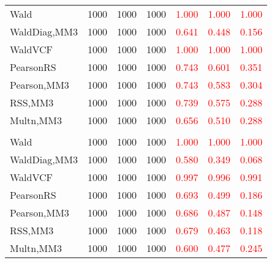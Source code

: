 \documentclass[
]{article}
\begin{document}
\begin{table}[H]
{\begin{tabular}[t]{lrrrrrr}
\hspace{1em}Wald & 1000 & 1000 & 1000 & \textcolor{red}{1.000} & \textcolor{red}{1.000} & \vphantom{1} \textcolor{red}{1.000}\\
\hspace{1em}WaldDiag,MM3 & 1000 & 1000 & 1000 & \textcolor{red}{0.641} & \textcolor{red}{0.448} & \textcolor{red}{0.156}\\
\hspace{1em}WaldVCF & 1000 & 1000 & 1000 & \textcolor{red}{1.000} & \textcolor{red}{1.000} & \textcolor{red}{1.000}\\
\hspace{1em}PearsonRS & 1000 & 1000 & 1000 & \textcolor{red}{0.743} & \textcolor{red}{0.601} & \textcolor{red}{0.351}\\
\hspace{1em}Pearson,MM3 & 1000 & 1000 & 1000 & \textcolor{red}{0.743} & \textcolor{red}{0.583} & \textcolor{red}{0.304}\\
\hspace{1em}RSS,MM3 & 1000 & 1000 & 1000 & \textcolor{red}{0.739} & \textcolor{red}{0.575} & \textcolor{red}{0.288}\\
\hspace{1em}Multn,MM3 & 1000 & 1000 & 1000 & \textcolor{red}{0.656} & \textcolor{red}{0.510} & \textcolor{red}{0.288}\\
\addlinespace[0.3em]
\multicolumn{7}{l}{\textbf{3F 15V}}\\
\hspace{1em}Wald & 1000 & 1000 & 1000 & \textcolor{red}{1.000} & \textcolor{red}{1.000} & \textcolor{red}{1.000}\\
\hspace{1em}WaldDiag,MM3 & 1000 & 1000 & 1000 & \textcolor{red}{0.580} & \textcolor{red}{0.349} & \textcolor{red}{0.068}\\
\hspace{1em}WaldVCF & 1000 & 1000 & 1000 & \textcolor{red}{0.997} & \textcolor{red}{0.996} & \textcolor{red}{0.991}\\
\hspace{1em}PearsonRS & 1000 & 1000 & 1000 & \textcolor{red}{0.693} & \textcolor{red}{0.499} & \textcolor{red}{0.186}\\
\hspace{1em}Pearson,MM3 & 1000 & 1000 & 1000 & \textcolor{red}{0.686} & \textcolor{red}{0.487} & \textcolor{red}{0.148}\\
\hspace{1em}RSS,MM3 & 1000 & 1000 & 1000 & \textcolor{red}{0.679} & \textcolor{red}{0.463} & \textcolor{red}{0.118}\\
\hspace{1em}Multn,MM3 & 1000 & 1000 & 1000 & \textcolor{red}{0.600} & \textcolor{red}{0.477} & \textcolor{red}{0.245}\\
\bottomrule
\end{tabular}}
\endgroup{}
\end{table}
\end{document}
